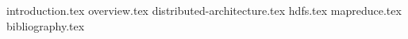 \documentclass[a4paper,11pt]{report}
\begin{document}
 
 
 
 

{introduction.tex}
{overview.tex}
{distributed-architecture.tex}
{hdfs.tex}
{mapreduce.tex}
{bibliography.tex}
 
\end{document}
